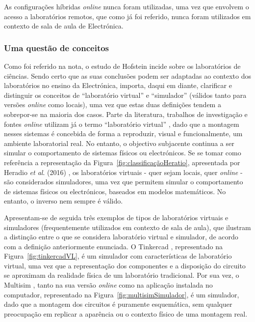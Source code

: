 As configurações híbridas \textit{online} nunca foram utilizadas, uma vez que envolvem o acesso a laboratórios remotos, que como já foi referido, nunca foram utilizados  em contexto de sala de aula de Electrónica.

\subsubsection{Uma questão de conceitos}
\label{sec:questaodeconceitos}
Como foi referido na nota, o estudo de Hofstein incide sobre os laboratórios de ciências. Sendo certo que as suas conclusões podem ser adaptadas ao contexto dos laboratórios no ensino da Electrónica, importa, daqui em diante, clarificar e distinguir os conceitos de ``laboratório virtual'' e ``simulador'' (válidos tanto para versões \textit{online} como locais), uma vez que estas duas definições tendem a sobrepor-se na maioria dos casos. Parte da literatura, trabalhos de investigação e fontes \textit{online} utilizam já o termo ``laboratório virtual'' \cite{BRINSON2015218, virtuallabng, EMaster2024May}, dado que a montagem nesses sistemas é concebida de forma a reproduzir, visual e funcionalmente, um ambiente laboratorial real. No entanto, o objectivo subjacente continua a ser simular o comportamento de sistemas físicos ou electrónicos. Se se tomar como referência a representação da Figura~\ref{fig:classificaçãoHeratio}, apresentada por Heradio \textit{et al}. (2016) \cite{HERADIO20161}, os laboratórios virtuais - quer sejam locais, quer \textit{online} - são considerados simuladores, uma vez que permitem simular o comportamento de sistemas físicos ou electrónicos, baseados em modelos matemáticos. No entanto, o inverso nem sempre é válido.

Apresentam-se de seguida três exemplos de tipos de laboratórios virtuais e simuladores (frequentemente utilizados em contexto de sala de aula), que ilustram a distinção entre o que se considera laboratório virtual e simulador, de acordo com a definição anteriormente enunciada. O Tinkercad \cite{tinkercad}, representado na Figura~\ref{fig:tinkercadVL}, é um simulador com características de laboratório virtual, uma vez que a representação dos componentes e a disposição do circuito se aproximam da realidade física de um laboratório tradicional. Por sua vez, o Multisim \cite{multisim}, tanto na sua versão \textit{online} como na aplicação instalada no computador, representado na Figura~\ref{fig:multisimSimulador}, é um simulador, dado que a montagem dos circuitos é puramente esquemática, sem qualquer preocupação em replicar a aparência ou o contexto físico de uma montagem real.

